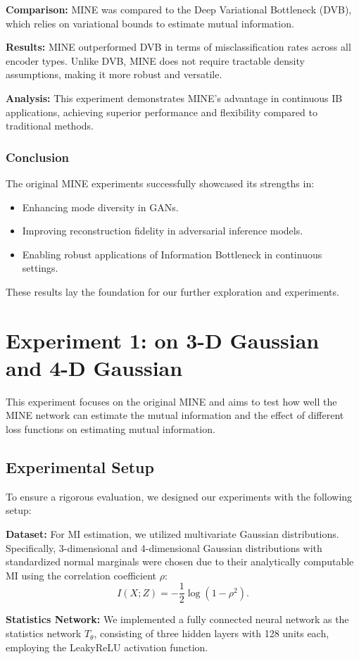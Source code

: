 \documentclass[lettersize,journal]{IEEEtran}
\begin{document}
\textbf{Comparison:} MINE was compared to the Deep Variational Bottleneck (DVB), which relies on variational bounds to estimate mutual information.

\textbf{Results:}
MINE outperformed DVB in terms of misclassification rates across all encoder types.
Unlike DVB, MINE does not require tractable density assumptions, making it more robust and versatile.

\textbf{Analysis:}
This experiment demonstrates MINE's advantage in continuous IB applications, achieving superior performance and flexibility compared to traditional methods.

\subsubsection{Conclusion}
The original MINE experiments successfully showcased its strengths in:
\begin{itemize}
    \item Enhancing mode diversity in GANs.
    \item Improving reconstruction fidelity in adversarial inference models.
    \item Enabling robust applications of Information Bottleneck in continuous settings.
\end{itemize}
These results lay the foundation for our further exploration and experiments.

\section{Experiment 1: on 3-D Gaussian and 4-D Gaussian}
This experiment focuses on the original MINE and aims to test how well the MINE network can estimate the mutual information and the effect of different loss functions on estimating mutual information.
\subsection{Experimental Setup}
To ensure a rigorous evaluation, we designed our experiments with the following setup:

\textbf{Dataset:} For MI estimation, we utilized multivariate Gaussian distributions. Specifically, 3-dimensional and 4-dimensional Gaussian distributions with standardized normal marginals were chosen due to their analytically computable MI using the correlation coefficient $\rho$:
    \[
    I(X; Z) = -\frac{1}{2} \log(1 - \rho^2).
    \]
    
\textbf{Statistics Network:} We implemented a fully connected neural network as the statistics network \( T_\theta \), consisting of three hidden layers with 128 units each, employing the LeakyReLU activation function.
    
\end{document}
